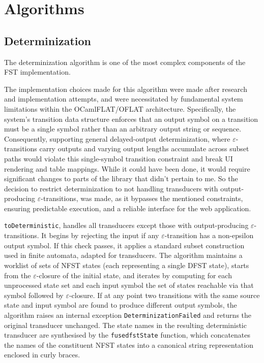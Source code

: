 \section{Algorithms}
\label{sec:back_algorithms}

\subsection{Determinization}
The determinization algorithm is one of the most complex components of the FST implementation. 

The implementation choices made for this algorithm were made after research and implementation attempts, and were necessitated by fundamental system limitations 
within the OCamlFLAT/OFLAT architecture. Specifically, the system's transition data structure enforces that an output symbol 
on a transition must be a single symbol rather than an arbitrary output string or sequence. 
Consequently, supporting general delayed-output determinization, where $\varepsilon$-transitions 
carry outputs and varying output lengths accumulate across subset paths would violate this single-symbol transition constraint 
and break UI rendering and table mappings. While it could have been done, it would require significant changes to parts of the library that
didn't pertain to me. So the decision to restrict determinization to not handling transducers with output-producing $\varepsilon$-transitions,
was made, as it bypasses the mentioned constraints, ensuring predictable execution, and a reliable interface for the web application.

\texttt{toDeterministic}, handles all transducers except those with output-producing $\varepsilon$-transitions. 
It begins by rejecting the input if any $\varepsilon$-transition has a non-epsilon output symbol. 
If this check passes, it applies a standard subset construction used in finite automata, adapted for transducers. 
The algorithm maintains a worklist of sets of NFST states (each representing a single DFST state), 
starts from the $\varepsilon$-closure of the initial state, and iterates by computing for each unprocessed state 
set and each input symbol the set of states reachable via that symbol followed by $\varepsilon$-closure. 
If at any point two transitions with the same source state and input symbol are found to produce different output symbols, 
the algorithm raises an internal exception \texttt{DeterminizationFailed} and returns the original transducer unchanged. 
The state names in the resulting deterministic transducer are synthesised by the \texttt{fusedfstState} function, 
which concatenates the names of the constituent NFST states into a canonical string representation enclosed in curly braces.



